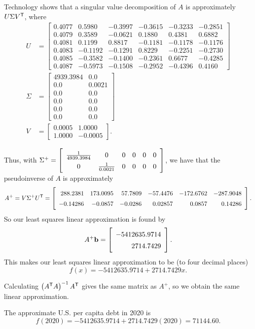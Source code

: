 \begin{example}
\item Technology shows that a singular value decomposition of $A$ is approximately $U \Sigma V^{\mathsf{T}}$, where 
\begin{align*}
U &= \left[\begin{array}{rrrrrr}
0.4077 & 0.5980 & -0.3997 & -0.3615 & -0.3233 & -0.2851 \\
0.4079 & 0.3589 & -0.0621 & 0.1880 & 0.4381 & 0.6882 \\
0.4081 & 0.1199 & 0.8817 & -0.1181 & -0.1178 & -0.1176 \\
0.4083 & -0.1192 & -0.1291 & 0.8229 & -0.2251 & -0.2730 \\
0.4085 & -0.3582 & -0.1400 & -0.2361 & 0.6677 & -0.4285 \\
0.4087 & -0.5973 & -0.1508 & -0.2952 & -0.4396 & 0.4160
\end{array}\right] \\
 \Sigma &=  \left[\begin{array}{cc}
4939.3984 & 0.0 \\
0.0 & 0.0021 \\
0.0 & 0.0 \\
0.0 & 0.0 \\
0.0 & 0.0 \\
0.0 & 0.0
\end{array}\right] \\ 
V &= \left[\begin{array}{cr}
0.0005 & 1.0000 \\
1.0000 & -0.0005
\end{array}\right].
\end{align*}

Thus, with $\Sigma^+ = \left[ \renewcommand{\arraystretch}{1.4} \begin{array}{cccccc} \frac{1}{4939.3984}&0&0&0&0&0 \\ 0&\frac{1}{0.0021}&0&0&0&0 \end{array} \right]$, we have that the pseudoinverse of $A$ is approximately
\[A^+ = V \Sigma^+ U^{\tr} = \left[\begin{array}{rrrrrr}
288.2381 & 173.0095 & 57.7809 & -57.4476 & -172.6762 & -287.9048 \\
-0.14286 & -0.0857 & -0.0286 & 0.02857 & 0.0857 & 0.14286 \end{array}\right].\]
So our least squares linear approximation is found by 
\[A^{+} \vb = \left[ \begin{array}{r} -5412635.9714 \\ 2714.7429 \end{array} \right].\]
This makes our least squares linear approximation to be (to four decimal places)
\[f(x) = -5412635.9714 + 2714.7429x.\]

\item Calculating $\left(A^{\mathsf{T}}A\right)^{-1}A^{\mathsf{T}}$ gives the same matrix as $A^+$, so we obtain the same linear approximation.

\item The approximate U.S. per capita debt in 2020 is 
\[f(2020) = -5412635.9714 + 2714.7429(2020) = 71144.60.\]

\ea

\end{example}

